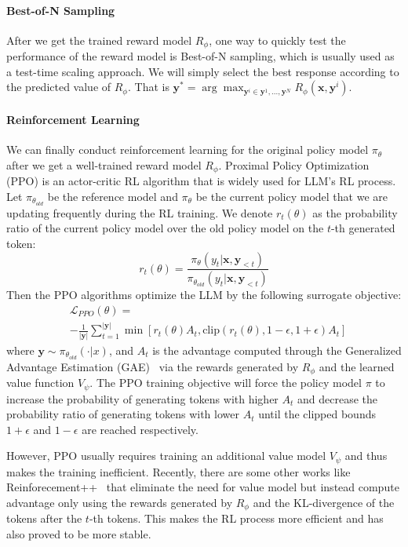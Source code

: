 \paragraph{Best-of-N Sampling}
After we get the trained reward model $R_\phi$, one way to quickly test the performance of the reward model is Best-of-N sampling, which is usually used as a test-time scaling approach. We will simply select the best response according to the predicted value of $R_\phi$. That is $\mathbf{y}^* = \arg\max_{\mathbf{y}^i \in {\mathbf{y}^1,...,\mathbf{y}^N}} R_\phi(\mathbf{x},\mathbf{y}^i)$. 

\paragraph{Reinforcement Learning}
We can finally conduct reinforcement learning for the original policy model $\pi_{\theta}$ after we get a well-trained reward model $R_\phi$. Proximal Policy Optimization (PPO) is an actor-critic RL algorithm that is widely used for LLM's RL process. Let $\pi_{\theta_{old}}$ be the reference model and $\pi_{\theta}$ be the current policy model that we are updating frequently during the RL training. We denote $r_t(\theta)$ as the probability ratio of the current policy model over the old policy model on the $t$-th generated token:
\begin{equation}
    r_t(\theta) = \frac{\pi_{\theta}(y_t|\mathbf{x}, \mathbf{y}_{<t})}{\pi_{\theta_{old}}(y_t|\mathbf{x}, \mathbf{y}_{<t})}
\end{equation}
Then the PPO algorithms optimize the LLM by the following surrogate objective:
\begin{equation*}
\begin{split}
    &\mathcal{L}_{PPO}(\theta) = \\
    &-\frac{1}{|\mathbf{y}|}\sum_{t=1}^{|\mathbf{y}|}\min \left [r_t\left (\theta\right )A_t, \text{clip}\left (r_t\left (\theta\right ), 1-\epsilon,1+\epsilon\right )A_t \right ]
\end{split}
\end{equation*}
where $\mathbf{y} \sim \pi_{\theta_{old}}(\cdot|x)$, and $A_t$ is the advantage computed through the Generalized Advantage Estimation (GAE)~\citep{Schulman2015HighDimensionalCC} via the rewards generated by $R_\phi$ and the learned value function $V_\psi$. The PPO training objective will force the policy model $\pi$ to increase the probability of generating tokens with higher $A_t$ and decrease the probability ratio of generating tokens with lower $A_t$ until the clipped bounds $1+\epsilon$ and $1-\epsilon$ are reached respectively.

However, PPO usually requires training an additional value model $V_\psi$ and thus makes the training inefficient. Recently, there are some other works like Reinforecement++~\citep{reinforce++} that eliminate the need for value model but instead compute advantage only using the rewards generated by $R_\phi$ and the KL-divergence of the tokens after the $t$-th tokens. This makes the RL process more efficient and has also proved to be more stable.